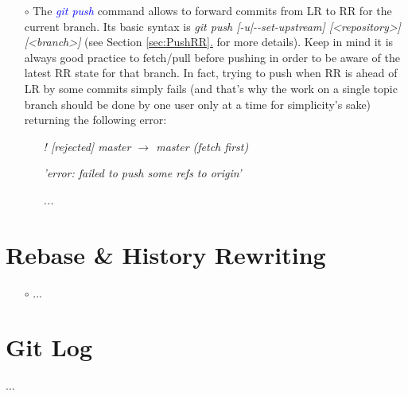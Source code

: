 \documentclass[a4paper,portrait,10pt]{article}   %
\newcommand{\mycmd}[1]{\textcolor{blue}{\textit{#1}}}   %
\newcommand{\myvspace}{\vspace{4mm}}   %
\newcommand{\mysecref}[1]{\hyperref[#1]{\ref{#1}.}}   %
\begin{document}
\begin{itemize}
\item[$\circ$] The \mycmd{git push} command allows to forward commits from LR to RR for the current branch. Its basic syntax is \textit{git push [-u|-{}-set-upstream] [<repository>] [<branch>]} (see Section \mysecref{sec:PushRR} for more details). Keep in mind it is always good practice to fetch/pull before pushing in order to be aware of the latest RR state for that branch. In fact, trying to push when RR is ahead of LR by some commits simply fails (and that's why the work on a single topic branch should be done by one user only at a time for simplicity's sake) returning the following error:
\begin{itemize}
  \item[] \textit{! [rejected]   master $\rightarrow$ master (fetch first)}
  \item[] \textit{'error: failed to push some refs to origin'}
  \item[] \textit{...}
\end{itemize}
\end{itemize}
\myvspace


\section{Rebase \& History Rewriting}   \label{sec:Rebase}

\begin{itemize}
\item[$\circ$] ...

\end{itemize}
\myvspace








\section{Git Log}   \label{sec:GitLog}
...

\end{document}
